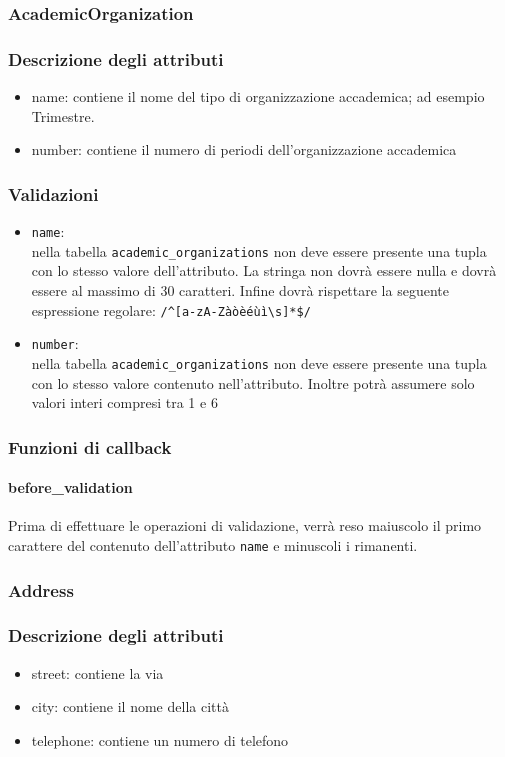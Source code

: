 \documentclass[11pt,a4paper]{article}
\begin{document}
\subsubsection{AcademicOrganization}
\subsubsection*{Descrizione degli attributi}
\begin{itemize}
 \item name: contiene il nome del tipo di organizzazione accademica; ad esempio Trimestre.
 \item number: contiene il numero di periodi dell'organizzazione accademica
\end{itemize}
\subsubsection*{Validazioni}
\begin{itemize}
 \item \verb|name|:\\ nella tabella \verb|academic_organizations| non deve essere presente una tupla con lo stesso valore dell'attributo. La stringa non dovrà essere nulla e dovrà essere al massimo di 30 caratteri. Infine dovrà rispettare la seguente espressione regolare: \verb|/^[a-zA-Zàòèéùì\s]*$/|
\item \verb|number|:\\ nella tabella \verb|academic_organizations| non deve essere presente una tupla con lo stesso valore contenuto nell'attributo. Inoltre potrà assumere solo valori interi compresi tra 1 e 6
\end{itemize}
\subsubsection*{Funzioni di callback}
\paragraph{before\_validation}
Prima di effettuare le operazioni di validazione, verrà reso maiuscolo il primo carattere del contenuto dell'attributo \verb|name| e minuscoli i rimanenti.
\subsubsection{Address}
\subsubsection*{Descrizione degli attributi}
\begin{itemize}
 \item street: contiene la via
 \item city: contiene il nome della città
 \item telephone: contiene un numero di telefono
\end{itemize}
\end{document}
